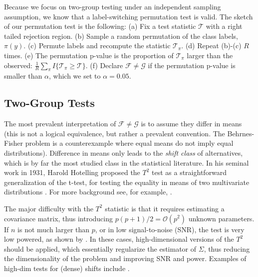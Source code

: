 \documentclass[]{bio}
\begin{document}
Because we focus on two-group testing under an independent sampling assumption, we know that a label-switching permutation test is valid. 
The sketch of our permutation test is the following: \newline
(a) Fix a test statistic $\mathcal{T}$ with a right tailed rejection region. \newline
(b) Sample a random permutation of the class labels, $\pi(y)$. \newline
(c) Permute labels and recompute the statistic $\mathcal{T}_\pi$. \newline
(d) Repeat (b)-(c) $R$ times. \newline
(e) The permutation p-value is the proportion of  $\mathcal{T}_\pi$ larger than the observed: 
$\frac{1}{R} \sum_{\pi} I\{\mathcal{T}_\pi \geq \mathcal{T}\}$.\newline
(f) Declare $\mathcal{F}\neq \mathcal{G}$ if the permutation p-value is smaller than $\alpha$, which we set to $\alpha=0.05$.
\bigskip



\subsection{Two-Group Tests}
The most prevalent interpretation of $\mathcal{F}\neq \mathcal{G}$ is to assume they differ in means (this is not a logical equivalence, but rather a prevalent convention. The Behrnes-Fisher problem is a counterexample where equal means do not imply equal distributions). 
Difference in means only leads to the \emph{shift class} of alternatives, which is by far the most studied class in the statistical literature. 
In his seminal work in 1931, Harold Hotelling proposed the $T^2$ test as a straightforward generalization of the t-test, for testing the equality in means of two multivariate distributions \citep{hotelling_generalization_1931}. 
For more background see, for example, \cite{anderson_introduction_2003}.

The major difficulty with the $T^2$ statistic is that it requires estimating a covariance matrix, thus introducing $p(p+1)/2=\mathcal{O}(p^2)$ unknown parameters.
If $n$ is not much larger than $p$, or in low signal-to-noise (SNR), the test is very low powered, as shown by \cite{bai1996effect}. 
In these cases, high-dimensional versions of the $T^2$ should be applied, which essentially regularize the estimator of $\Sigma$, thus reducing the dimensionality of the problem and improving SNR and power.
Examples of high-dim tests for (dense) shifts include 
\cite{dempster1958high,bai1996effect,schafer_shrinkage_2005,goeman2006testing,srivastava_test_2008,chen_two-sample_2010,lopes2011more,ahmad2014u,thulin2014high,feng2015note}.
\end{document}
